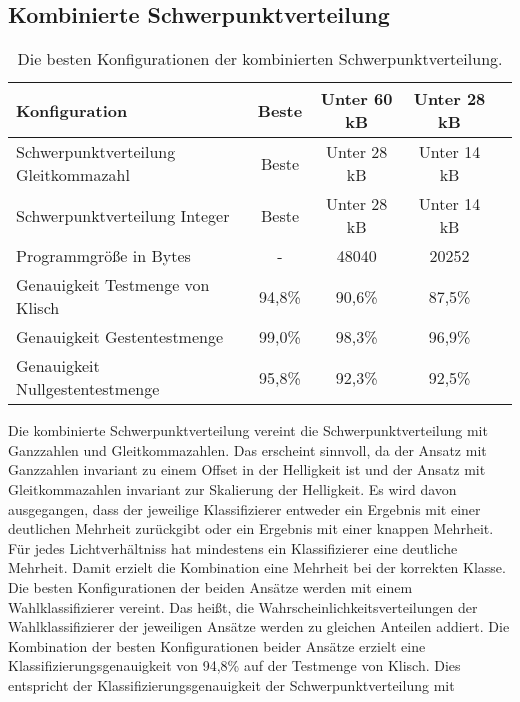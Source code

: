 \subsection{Kombinierte Schwerpunktverteilung}
\begin{table}[h!]
    \centering
    \begin{tabular}{ | l | c | c | c | c |}
        \hline
        Konfiguration & Beste & Unter 60 kB & Unter 28 kB \\\hline
        Schwerpunktverteilung Gleitkommazahl & Beste & Unter 28 kB & Unter 14 kB \\\hline
        Schwerpunktverteilung Integer & Beste &  Unter 28 kB & Unter 14 kB \\\hline
        Programmgröße in Bytes & - & 48040 & 20252 \\\hline
        Genauigkeit Testmenge von Klisch & 94,8\% & 90,6\% & 87,5\% \\\hline
        Genauigkeit Gestentestmenge & 99,0\% & 98,3\% & 96,9\% \\\hline
        Genauigkeit Nullgestentestmenge & 95,8\% & 92,3\% & 92,5\% \\\hline
    \end{tabular}
    \caption{Die besten Konfigurationen der kombinierten Schwerpunktverteilung.}
    \label{tab:schwerpunktverteilung_int_and_float}
\end{table}
Die kombinierte Schwerpunktverteilung vereint die Schwerpunktverteilung mit Ganzzahlen und Gleitkommazahlen. Das erscheint sinnvoll, da der Ansatz mit Ganzzahlen invariant zu einem Offset in der
Helligkeit ist und der Ansatz mit Gleitkommazahlen invariant zur Skalierung der Helligkeit.
\newline
\newline
Es wird davon ausgegangen, dass der jeweilige Klassifizierer entweder ein Ergebnis mit einer deutlichen Mehrheit zurückgibt oder ein Ergebnis mit einer knappen Mehrheit. Für jedes Lichtverhältniss hat mindestens ein
Klassifizierer eine deutliche Mehrheit. Damit erzielt die Kombination eine Mehrheit bei der korrekten Klasse. Die besten Konfigurationen der beiden Ansätze werden mit einem Wahlklassifizierer vereint.
Das heißt, die Wahrscheinlichkeitsverteilungen der Wahlklassifizierer der jeweiligen Ansätze werden zu gleichen Anteilen addiert.
\newline
\newline
Die Kombination der besten Konfigurationen beider Ansätze erzielt eine Klassifizierungsgenauigkeit von 94,8\% auf der Testmenge von Klisch. Dies entspricht der Klassifizierungsgenauigkeit der Schwerpunktverteilung mit
